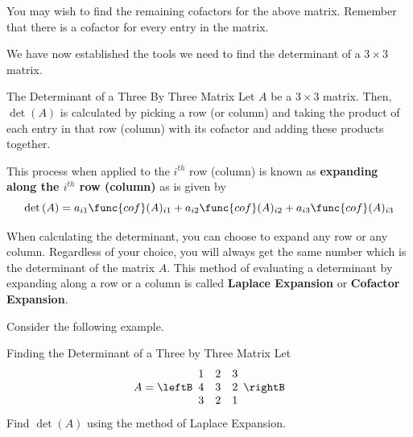 You may wish to find the remaining cofactors for the above matrix. Remember that there is a cofactor 
for every entry in the matrix.  

We have now established the tools we need to find the determinant of a $3 \times3 $ matrix.

\begin{definition}{The Determinant of a Three By Three Matrix}\label{def:threebythreedeterminant}
Let $A$ be a $3\times 3$ matrix. Then, $\det \left(A\right)$ is calculated by picking a row
(or column) and taking the product of each entry in that row (column) with its
cofactor and adding these products together. 

This process when applied to the $i^{th}$
row (column) is known as \textbf{expanding along the $i^{th}$ row
(column)}  as is given by 
\[
\det \left(A\right) = a_{i1}\func{cof}(A)_{i1} + a_{i2}\func{cof}(A)_{i2} + a_{i3}\func{cof}(A)_{i3}
\]

\end{definition}

When calculating the determinant, you can choose to expand any row or any column. Regardless 
of your choice, you will always get the same number which is the determinant of the matrix $A.$ 
This method of evaluating a determinant by expanding along a row or a column is called \textbf{Laplace
Expansion} or \textbf{Cofactor Expansion}.
 

Consider the following example. 

\begin{example}{Finding the Determinant of a Three by Three Matrix}\label{exa:determinantthreebythree}
Let 
\begin{equation*}
A=\leftB
\begin{array}{rrr}
1 & 2 & 3 \\
4 & 3 & 2 \\
3 & 2 & 1
\end{array}
\rightB 
\end{equation*}
Find $\det\left(A\right)$ using the method of Laplace Expansion.
\end{example}

